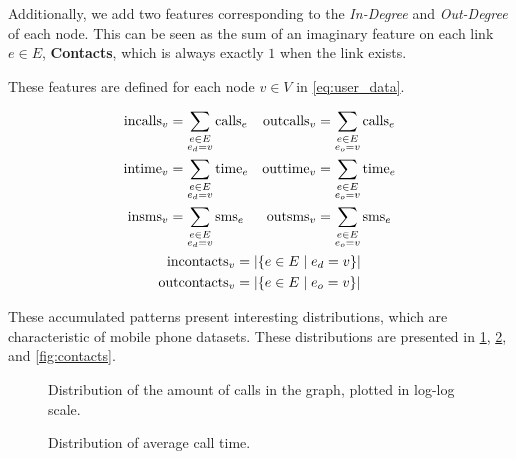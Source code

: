 Additionally, we add two features corresponding to the \emph{In-Degree} and \emph{Out-Degree} of each node. This can be seen as the sum of an imaginary feature on each link $e \in E$, \textbf{Contacts}, which is always exactly $1$ when the link exists.

These features are defined for each node $v \in V$ in \cref{eq:user_data}.

\begin{equation}
\begin{gathered}
\begin{aligned}
\operatorname{incalls}_v &= \sum_{\substack{e \in E \\ e_d = v}} \operatorname{calls}_e &
\operatorname{outcalls}_v &= \sum_{\substack{e \in E \\ e_o = v}} \operatorname{calls}_e \\
\operatorname{intime}_v &= \sum_{\substack{e \in E \\ e_d = v}} \operatorname{time}_e &
\operatorname{outtime}_v &= \sum_{\substack{e \in E \\ e_o = v}} \operatorname{time}_e \\
\operatorname{insms}_v &= \sum_{\substack{e \in E \\ e_d = v}} \operatorname{sms}_e &
\operatorname{outsms}_v &= \sum_{\substack{e \in E \\ e_o = v}} \operatorname{sms}_e \\
\end{aligned} \\
\begin{aligned}
\operatorname{incontacts}_v &= \left| \left\{ e \in E \mid e_d = v \right\} \right| \\
\operatorname{outcontacts}_v &= \left| \left\{ e \in E \mid e_o = v \right\} \right|
\end{aligned}
\end{gathered}
\label{eq:user_data}
\end{equation}

These accumulated patterns present interesting distributions, 
which are characteristic of mobile phone datasets. These distributions are presented in \cref{fig:callsms}, \cref{fig:time}, and \cref{fig:contacts}.

\begin{figure}
\caption{Distribution of the amount of calls in the graph, plotted in log-log scale.}
\label{fig:callsms}
\end{figure}

\begin{figure}
\caption{Distribution of average call time.}
\label{fig:time}
\end{figure}

